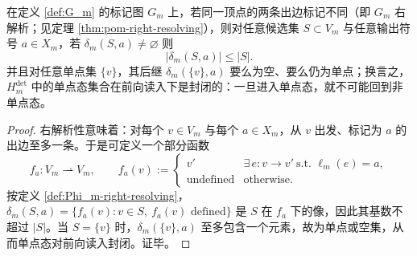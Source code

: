\begin{proposition}\label{prop:det-candidate-set-monotone}
在定义 \ref{def:G_m} 的标记图 $G_m$ 上，若同一顶点的两条出边标记不同（即 $G_m$ 右解析；见定理 \ref{thm:pom-right-resolving}），则对任意候选集 $S\subset V_m$ 与任意输出符号 $a\in X_m$，若 $\delta_m(S,a)\neq\varnothing$ 则
\[
|\delta_m(S,a)|\le |S|.
\]
并且对任意单点集 $\{v\}$，其后继 $\delta_m(\{v\},a)$ 要么为空、要么仍为单点；换言之，$H_m^{\mathrm{det}}$ 中的单点态集合在前向读入下是封闭的：一旦进入单点态，就不可能回到非单点态。
\end{proposition}
\begin{proof}
右解析性意味着：对每个 $v\in V_m$ 与每个 $a\in X_m$，从 $v$ 出发、标记为 $a$ 的出边至多一条。于是可定义一个部分函数
\[
f_a:V_m\rightharpoonup V_m,\qquad
f_a(v):=
\begin{cases}
v' & \exists\,e:v\to v'\ \text{s.t. }\ell_m(e)=a,\\
\text{undefined} & \text{otherwise}.
\end{cases}
\]
按定义 \ref{def:Phi_m-right-resolving}，
\(
\delta_m(S,a)=\{f_a(v):v\in S,\ f_a(v)\text{ defined}\}
\)
是 $S$ 在 $f_a$ 下的像，因此其基数不超过 $|S|$。当 $S=\{v\}$ 时，$\delta_m(\{v\},a)$ 至多包含一个元素，故为单点或空集，从而单点态对前向读入封闭。证毕。
\end{proof}

